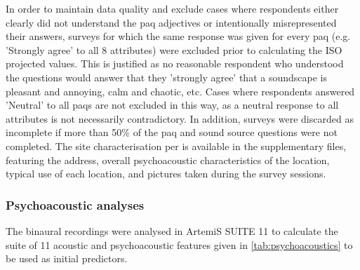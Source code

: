    In order to maintain data quality and exclude cases where respondents either clearly did not understand the \gls{paq} adjectives or intentionally misrepresented their answers, surveys for which the same response was given for every \gls{paq} (e.g. 'Strongly agree' to all 8 attributes) were excluded prior to calculating the ISO projected values. This is justified as no reasonable respondent who understood the questions would answer that they 'strongly agree' that a soundscape is pleasant and annoying, calm and chaotic, etc. Cases where respondents answered 'Neutral' to all \glspl{paq} are not excluded in this way, as a neutral response to all attributes is not necessarily contradictory. In addition, surveys were discarded as incomplete if more than 50\% of the \gls{paq} and sound source questions were not completed. The site characterisation per \citet{ISO12913Part2} is available in the supplementary files, featuring the address, overall psychoacoustic characteristics of the location, typical use of each location, and pictures taken during the survey sessions.

   \subsubsection{Psychoacoustic analyses}
   \label{sec:analyses}
   The binaural recordings were analysed in ArtemiS SUITE 11 to calculate the suite of 11 acoustic and psychoacoustic features given in \cref{tab:psychoacoustics} to be used as initial predictors.

